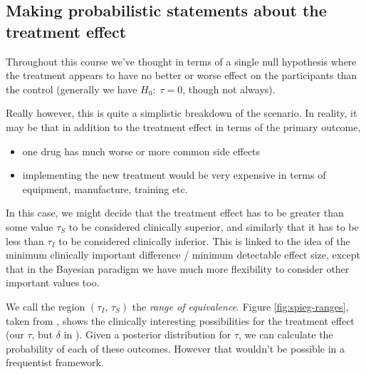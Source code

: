 \documentclass[
  openany]{book}
\providecommand{\tightlist}{%
  \setlength{\itemsep}{0pt}\setlength{\parskip}{0pt}}
\theoremstyle{definition}
\theoremstyle{definition}
\theoremstyle{definition}
\theoremstyle{definition}
\theoremstyle{remark}
\begin{document}
\hypertarget{making-probabilistic-statements-about-the-treatment-effect}{%
\subsection*{Making probabilistic statements about the treatment effect}\label{making-probabilistic-statements-about-the-treatment-effect}}

Throughout this course we've thought in terms of a single null hypothesis where the treatment appears to have no better or worse effect on the participants than the control (generally we have \(H_0:\; \tau=0\), though not always).

Really however, this is quite a simplistic breakdown of the scenario. In reality, it may be that in addition to the treatment effect in terms of the primary outcome,

\begin{itemize}
\tightlist
\item
  one drug has much worse or more common side effects
\item
  implementing the new treatment would be very expensive in terms of equipment, manufacture, training etc.
\end{itemize}

In this case, we might decide that the treatment effect has to be greater than some value \(\tau_S\) to be considered clinically superior, and similarly that it has to be less than \(\tau_I\) to be considered clinically inferior. This is linked to the idea of the minimum clinically important difference / minimum detectable effect size, except that in the Bayesian paradigm we have much more flexibility to consider other important values too.

We call the region \(\left(\tau_I,\,\tau_S\right)\) the \emph{range of equivalence}. Figure \ref{fig:spieg-ranges}, taken from \citet{spiegelhalter1994bayesian}, shows the clinically interesting possibilities for the treatment effect (our \(\tau\), but \(\delta\) in \citet{spiegelhalter1994bayesian}). Given a posterior distribution for \(\tau\), we can calculate the probability of each of these outcomes. However that wouldn't be possible in a frequentist framework.
\end{document}
